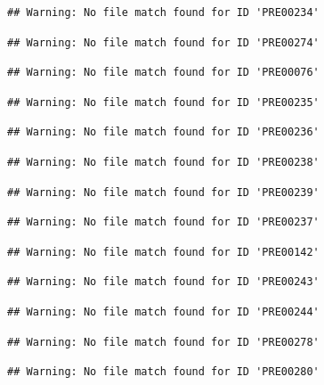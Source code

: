 \documentclass[
]{book}
\theoremstyle{definition}
\theoremstyle{definition}
\theoremstyle{definition}
\theoremstyle{definition}
\theoremstyle{remark}
\begin{document}
\begin{verbatim}
## Warning: No file match found for ID 'PRE00234'
\end{verbatim}

\begin{verbatim}
## Warning: No file match found for ID 'PRE00274'
\end{verbatim}

\begin{verbatim}
## Warning: No file match found for ID 'PRE00076'
\end{verbatim}

\begin{verbatim}
## Warning: No file match found for ID 'PRE00235'
\end{verbatim}

\begin{verbatim}
## Warning: No file match found for ID 'PRE00236'
\end{verbatim}

\begin{verbatim}
## Warning: No file match found for ID 'PRE00238'
\end{verbatim}

\begin{verbatim}
## Warning: No file match found for ID 'PRE00239'
\end{verbatim}

\begin{verbatim}
## Warning: No file match found for ID 'PRE00237'
\end{verbatim}

\begin{verbatim}
## Warning: No file match found for ID 'PRE00142'
\end{verbatim}

\begin{verbatim}
## Warning: No file match found for ID 'PRE00243'
\end{verbatim}

\begin{verbatim}
## Warning: No file match found for ID 'PRE00244'
\end{verbatim}

\begin{verbatim}
## Warning: No file match found for ID 'PRE00278'
\end{verbatim}

\begin{verbatim}
## Warning: No file match found for ID 'PRE00280'
\end{verbatim}
\end{document}
